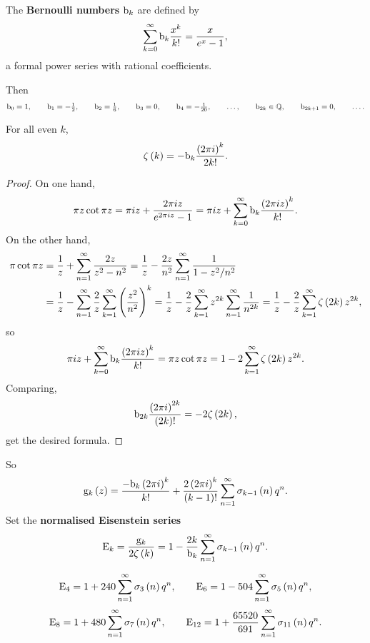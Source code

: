 \begin{definition}
The \textbf{Bernoulli numbers} $ \mathrm{b}_k $ are defined by
$$ \sum_{k = 0}^\infty \mathrm{b}_k\dfrac{x^k}{k!} = \dfrac{x}{e^x - 1}, $$
a formal power series with rational coefficients.
\end{definition}

Then
$$ \mathrm{b}_0 = 1, \qquad \mathrm{b}_1 = -\tfrac{1}{2}, \qquad \mathrm{b}_2 = \tfrac{1}{6}, \qquad \mathrm{b}_3 = 0, \qquad \mathrm{b}_4 = -\tfrac{1}{20}, \qquad \dots, \qquad \mathrm{b}_{2k} \in \mathbb{Q}, \qquad \mathrm{b}_{2k + 1} = 0, \qquad \dots. $$

\pagebreak

\begin{proposition}
For all even $ k $,
$$ \zeta\br{k} = -\b_k\dfrac{\br{2\pi i}^k}{2k!}. $$
\end{proposition}

\begin{proof}
On one hand,
$$ \pi z\cot \pi z = \pi iz + \dfrac{2\pi iz}{e^{2\pi iz} - 1} = \pi iz + \sum_{k = 0}^\infty \b_k\dfrac{\br{2\pi iz}^k}{k!}. $$
On the other hand,
\begin{align*}
\pi\cot \pi z
& = \dfrac{1}{z} + \sum_{n = 1}^\infty \dfrac{2z}{z^2 - n^2}
= \dfrac{1}{z} - \dfrac{2z}{n^2}\sum_{n = 1}^\infty \dfrac{1}{1 - z^2 / n^2} \\
& = \dfrac{1}{z} - \sum_{n = 1}^\infty \dfrac{2}{z}\sum_{k = 1}^\infty \br{\dfrac{z^2}{n^2}}^k
= \dfrac{1}{z} - \dfrac{2}{z}\sum_{k = 1}^\infty z^{2k}\sum_{n = 1}^\infty \dfrac{1}{n^{2k}}
= \dfrac{1}{z} - \dfrac{2}{z}\sum_{k = 1}^\infty \zeta\br{2k}z^{2k},
\end{align*}
so
$$ \pi iz + \sum_{k = 0}^\infty \b_k\dfrac{\br{2\pi iz}^k}{k!} = \pi z\cot \pi z = 1 - 2\sum_{k = 1}^\infty \zeta\br{2k}z^{2k}. $$
Comparing,
$$ \b_{2k}\dfrac{\br{2\pi i}^{2k}}{\br{2k}!} = -2\zeta\br{2k}, $$
get the desired formula.
\end{proof}

So
$$ \g_k\br{z} = \dfrac{-\b_k\br{2\pi i}^k}{k!} + \dfrac{2\br{2\pi i}^k}{\br{k - 1}!}\sum_{n = 1}^\infty \sigma_{k - 1}\br{n}q^n. $$
Set the \textbf{normalised Eisenstein series}
$$ \E_k = \dfrac{\g_k}{2\zeta\br{k}} = 1 - \dfrac{2k}{\b_k}\sum_{n = 1}^\infty \sigma_{k - 1}\br{n}q^n. $$

\begin{example*}
$$ \E_4 = 1 + 240\sum_{n = 1}^\infty \sigma_3\br{n}q^n, \qquad \E_6 = 1 - 504\sum_{n = 1}^\infty \sigma_5\br{n}q^n, $$
$$ \E_8 = 1 + 480\sum_{n = 1}^\infty \sigma_7\br{n}q^n, \qquad \E_{12} = 1 + \dfrac{65520}{691}\sum_{n = 1}^\infty \sigma_{11}\br{n}q^n. $$
\end{example*}

